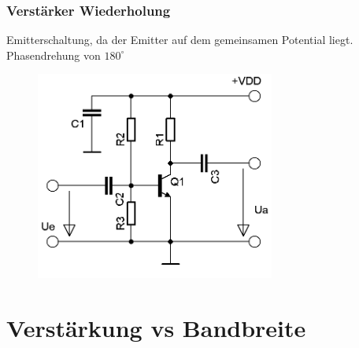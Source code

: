 \begin{frame}
  \frametitle{Verstärker Wiederholung}
  \begin{center}
    \large Emitterschaltung, da der Emitter auf dem gemeinsamen Potential liegt.\\
    Phasendrehung von $180^{\circ}$\\
    \begin{figure}
      \includegraphics[width=0.7\textwidth,height=.6\textheight,keepaspectratio]{a07/Transistor_Verstaerker_emitter.png}
    \end{figure}
  \end{center}
\end{frame}

\section*{Verstärkung vs Bandbreite}

